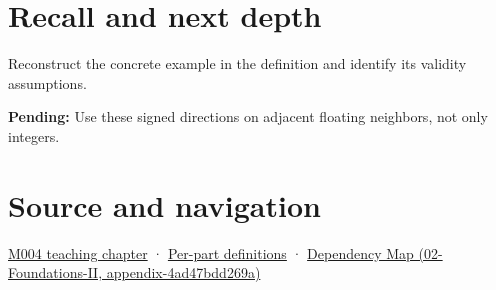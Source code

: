 \section{Recall and next depth}\label{appendix-637d164ae5ca-recall-and-next-depth}

Reconstruct the concrete example in the definition and identify its validity assumptions.

\textbf{Pending:} Use these signed directions on adjacent floating neighbors, not only integers.

\section{Source and navigation}\label{appendix-637d164ae5ca-source-and-navigation}

\href{Continuous\%20Notes/Computing\%20Foundations\%20-\%20From\%20Bits\%20to\%20C++\%20and\%20Systems\%20APIs\#A\%20stretching\%20ruler\%20for\%20real-valued\%20quantities}{M004 teaching chapter} · \hyperref[appendix-fd090d982a15-m004---parts-61-76]{Per-part definitions} · \href{../02-Foundations-II/main.pdf\#nameddest=appendix-4ad47bdd269a}{Dependency Map (02-Foundations-II, appendix-4ad47bdd269a)}

